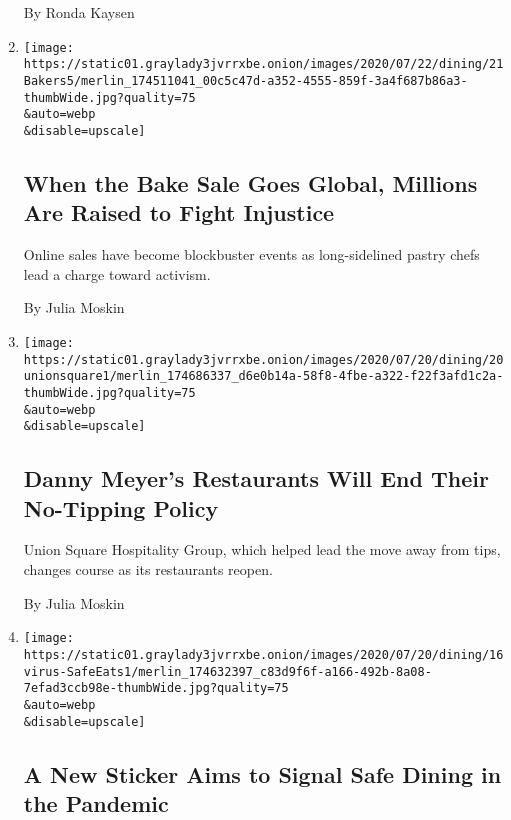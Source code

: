 \begin{enumerate}
  By Ronda Kaysen
\item
  \href{/2020/07/21/dining/bake-sale-activism-racism.html}{}

  \texttt{[image: https://static01.graylady3jvrrxbe.onion/images/2020/07/22/dining/21Bakers5/merlin\_174511041\_00c5c47d-a352-4555-859f-3a4f687b86a3-thumbWide.jpg?quality=75\\\&auto=webp\\\&disable=upscale]}

  \hypertarget{when-the-bake-sale-goes-global-millions-are-raised-to-fight-injustice}{%
  \subsection{When the Bake Sale Goes Global, Millions Are Raised to
  Fight
  Injustice}\label{when-the-bake-sale-goes-global-millions-are-raised-to-fight-injustice}}

  Online sales have become blockbuster events as long-sidelined pastry
  chefs lead a charge toward activism.

  By Julia Moskin
\item
  \href{/2020/07/20/dining/danny-meyer-no-tips.html}{}

  \texttt{[image: https://static01.graylady3jvrrxbe.onion/images/2020/07/20/dining/20unionsquare1/merlin\_174686337\_d6e0b14a-58f8-4fbe-a322-f22f3afd1c2a-thumbWide.jpg?quality=75\\\&auto=webp\\\&disable=upscale]}

  \hypertarget{danny-meyers-restaurants-will-end-their-no-tipping-policy}{%
  \subsection{Danny Meyer's Restaurants Will End Their No-Tipping
  Policy}\label{danny-meyers-restaurants-will-end-their-no-tipping-policy}}

  Union Square Hospitality Group, which helped lead the move away from
  tips, changes course as its restaurants reopen.

  By Julia Moskin
\item
  \href{/2020/07/17/dining/safe-eats-sticker-restaurants-coronavirus.html}{}

  \texttt{[image: https://static01.graylady3jvrrxbe.onion/images/2020/07/20/dining/16virus-SafeEats1/merlin\_174632397\_c83d9f6f-a166-492b-8a08-7efad3ccb98e-thumbWide.jpg?quality=75\\\&auto=webp\\\&disable=upscale]}

  \hypertarget{a-new-sticker-aims-to-signal-safe-dining-in-the-pandemic}{%
  \subsection{A New Sticker Aims to Signal Safe Dining in the
  Pandemic}\label{a-new-sticker-aims-to-signal-safe-dining-in-the-pandemic}}


\end{enumerate}
